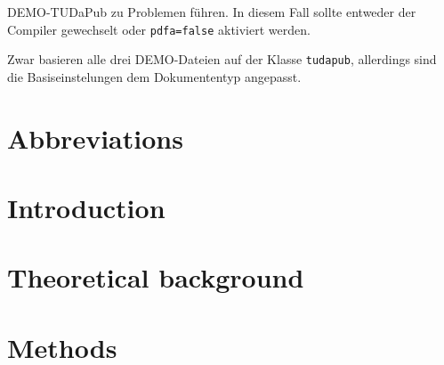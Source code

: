 \documentclass[
english,
ruledheaders=section,%
class=report,%
thesis={
	type=drfinal, dr=ing, department=matgeo},
accentcolor=9c,%
custommargins=true,%
marginpar=false,%
parskip=half-,%
fontsize=11pt,%
]{tudapub}
\let\code\texttt
\begin{document}
\affidavit

 DEMO-TUDaPub zu Problemen führen. In diesem Fall sollte entweder der Compiler gewechselt oder \code{pdfa=false} aktiviert werden.


Zwar basieren alle drei DEMO-Dateien auf der Klasse \code{tudapub}, allerdings sind die Basiseinstelungen dem Dokumententyp angepasst.


\begin{abstract}
	Deutsche Zusammenfassung
\end{abstract}

\begin{abstract}[english]
	Englische Zusammenfassung, falls benötigt
\end{abstract}

\begin{spacing}{1}
	\tableofcontents{}
\end{spacing}
\newpage

\begin{spacing}{1}
	\listoffigures
\end{spacing}
\newpage


\chapter*{Abbreviations}


\setcounter{chapter}{0}
\mainmatter

\chapter{Introduction} \label{c:into}


\chapter{Theoretical background} \label{c:theory}


\chapter{Methods} \label{c:methods}

\end{document}

